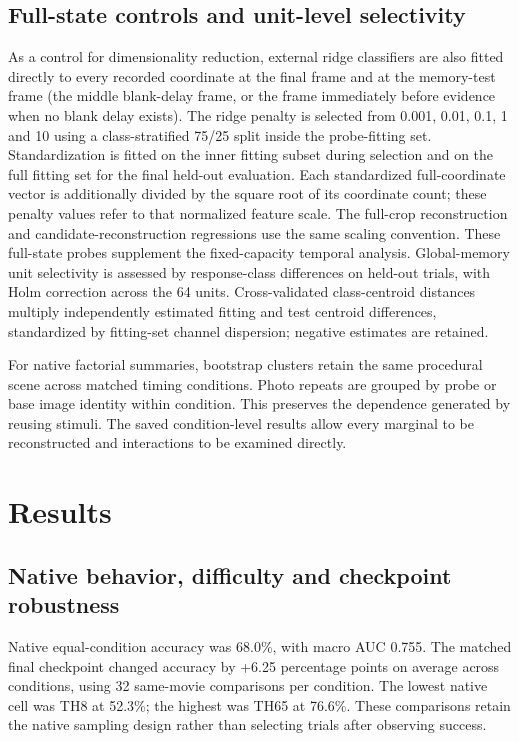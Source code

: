 \documentclass[11pt]{article}
\begin{document}
\subsection{Full-state controls and unit-level selectivity}
As a control for dimensionality reduction, external ridge classifiers are also fitted directly to every recorded coordinate at the final frame and at the memory-test frame (the middle blank-delay frame, or the frame immediately before evidence when no blank delay exists). The ridge penalty is selected from 0.001, 0.01, 0.1, 1 and 10 using a class-stratified 75/25 split inside the probe-fitting set. Standardization is fitted on the inner fitting subset during selection and on the full fitting set for the final held-out evaluation. Each standardized full-coordinate vector is additionally divided by the square root of its coordinate count; these penalty values refer to that normalized feature scale. The full-crop reconstruction and candidate-reconstruction regressions use the same scaling convention. These full-state probes supplement the fixed-capacity temporal analysis. Global-memory unit selectivity is assessed by response-class differences on held-out trials, with Holm correction across the 64 units. Cross-validated class-centroid distances multiply independently estimated fitting and test centroid differences, standardized by fitting-set channel dispersion; negative estimates are retained.

For native factorial summaries, bootstrap clusters retain the same procedural scene across matched timing conditions. Photo repeats are grouped by probe or base image identity within condition. This preserves the dependence generated by reusing stimuli. The saved condition-level results allow every marginal to be reconstructed and interactions to be examined directly.
\section{Results}
\subsection{Native behavior, difficulty and checkpoint robustness}
Native equal-condition accuracy was 68.0\%, with macro AUC 0.755. The matched final checkpoint changed accuracy by +6.25 percentage points on average across conditions, using 32 same-movie comparisons per condition. The lowest native cell was TH8 at 52.3\%; the highest was TH65 at 76.6\%. These comparisons retain the native sampling design rather than selecting trials after observing success.
\end{document}
